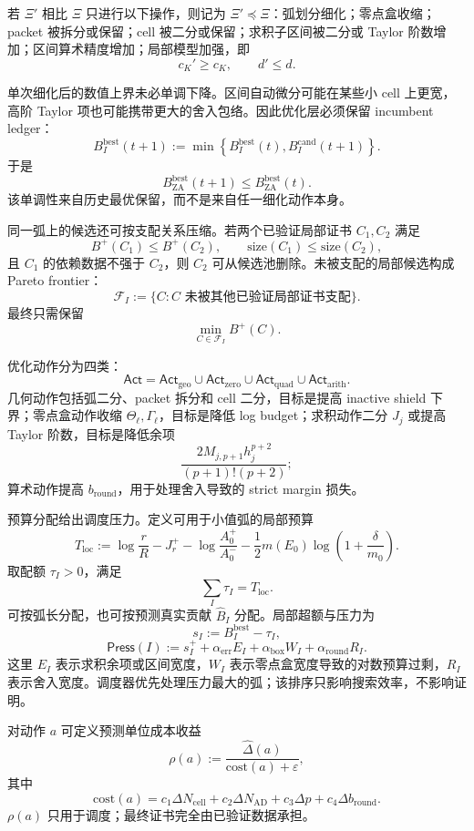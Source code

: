 \begin{definition}[细化偏序]\label{def:typed-address-biaxial-completion-refinement-preorder}
若 \(\Xi'\) 相比 \(\Xi\) 只进行以下操作，则记为 \(\Xi'\preceq\Xi\)：弧划分细化；零点盒收缩；packet 被拆分或保留；cell 被二分或保留；求积子区间被二分或 Taylor 阶数增加；区间算术精度增加；局部模型加强，即
\[
c_K'\ge c_K,
\qquad
d'\le d.
\]
\end{definition}

单次细化后的数值上界未必单调下降。区间自动微分可能在某些小 cell 上更宽，高阶 Taylor 项也可能携带更大的舍入包络。因此优化层必须保留 incumbent ledger：
\[
B_I^{\mathrm{best}}(t+1)
:=
\min\left\{
B_I^{\mathrm{best}}(t),
B_{I}^{\mathrm{cand}}(t+1)
\right\}.
\]
于是
\[
B_{\mathrm{ZA}}^{\mathrm{best}}(t+1)
\le
B_{\mathrm{ZA}}^{\mathrm{best}}(t).
\]
该单调性来自历史最优保留，而不是来自任一细化动作本身。

同一弧上的候选还可按支配关系压缩。若两个已验证局部证书 \(C_1,C_2\) 满足
\[
B^+(C_1)\le B^+(C_2),
\qquad
\mathrm{size}(C_1)\le\mathrm{size}(C_2),
\]
且 \(C_1\) 的依赖数据不强于 \(C_2\)，则 \(C_2\) 可从候选池删除。未被支配的局部候选构成 Pareto frontier：
\[
\mathcal F_I
:=
\{C:C\text{ 未被其他已验证局部证书支配}\}.
\]
最终只需保留
\[
\min_{C\in\mathcal F_I}B^+(C).
\]

优化动作分为四类：
\[
\mathsf{Act}
=
\mathsf{Act}_{\mathrm{geo}}
\cup
\mathsf{Act}_{\mathrm{zero}}
\cup
\mathsf{Act}_{\mathrm{quad}}
\cup
\mathsf{Act}_{\mathrm{arith}}.
\]
几何动作包括弧二分、packet 拆分和 cell 二分，目标是提高 inactive shield 下界；零点盒动作收缩 \(\Theta_\ell,\Gamma_\ell\)，目标是降低 log budget；求积动作二分 \(J_j\) 或提高 Taylor 阶数，目标是降低余项
\[
\frac{2M_{j,p+1}h_j^{p+2}}{(p+1)!(p+2)};
\]
算术动作提高 \(b_{\mathrm{round}}\)，用于处理舍入导致的 strict margin 损失。

预算分配给出调度压力。定义可用于小值弧的局部预算
\[
T_{\mathrm{loc}}
:=
\log\frac rR
-
J_r^+
-
\log\frac{A_0^+}{A_0^-}
-
\frac12m(E_0)\log\left(1+\frac{\delta}{m_0}\right).
\]
取配额 \(\tau_I>0\)，满足
\[
\sum_I\tau_I=T_{\mathrm{loc}}.
\]
可按弧长分配，也可按预测真实贡献 \(\widehat B_I\) 分配。局部超额与压力为
\[
s_I:=B_I^{\mathrm{best}}-\tau_I,
\]
\[
\mathsf{Press}(I)
:=
s_I^+
+
\alpha_{\mathrm{err}}E_I
+
\alpha_{\mathrm{box}}W_I
+
\alpha_{\mathrm{round}}R_I.
\]
这里 \(E_I\) 表示求积余项或区间宽度，\(W_I\) 表示零点盒宽度导致的对数预算过剩，\(R_I\) 表示舍入宽度。调度器优先处理压力最大的弧；该排序只影响搜索效率，不影响证明。

对动作 \(a\) 可定义预测单位成本收益
\[
\rho(a)
:=
\frac{\widehat\Delta(a)}
{\mathrm{cost}(a)+\varepsilon},
\]
其中
\[
\mathrm{cost}(a)
=
c_1\Delta N_{\mathrm{cell}}
+
c_2\Delta N_{\mathrm{AD}}
+
c_3\Delta p
+
c_4\Delta b_{\mathrm{round}}.
\]
\(\rho(a)\) 只用于调度；最终证书完全由已验证数据承担。

